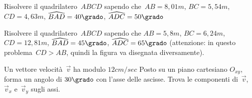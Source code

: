 
\begin{multicols}{2}
 \begin{esercizio}
\label{ese:G.34}
Risolvere il quadrilatero~$ABCD$ sapendo che~${AB}=8,01\unit{m}$,
${BC}=5,54\unit{m}$, ${CD}=4,63\unit{m}$, $\widehat{BAD}=40\grado$, 
$\widehat{ADC}=50\grado$
\end{esercizio}

\begin{esercizio}
\label{ese:G.35}
Risolvere il quadrilatero~$ABCD$ sapendo che  ${AB}=5,8\unit{m}$, 
${BC}=6,24\unit{m}$,
${CD}=12,81\unit{m}$, $\widehat{BAD}=45\grado$, $\widehat{ADC}=65\grado$
(attenzione: in questo problema~${CD}>{AB}$, quindi la figura va disegnata 
diversamente).
\end{esercizio}

% 
%  
\begin{esercizio}
\label{ese:G.37}
Un vettore velocità~$\vec{v}$ ha modulo $12\unit{cm/sec}$ Posto su un piano 
cartesiano $O_{xy}$, forma un angolo di $30\grado$ con
l'asse delle ascisse. Trova le componenti di~$\vec{v}$, $\vec{v}_x$ 
e~$\vec{v}_y$ sugli assi.
\end{esercizio}


\end{multicols}
